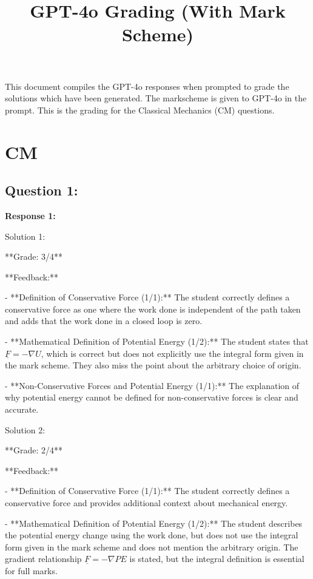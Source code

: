 \documentclass[a4paper,11pt]{article}
\begin{document}
\title{GPT-4o Grading (With Mark Scheme)}
\maketitle

This document compiles the GPT-4o responses when prompted to grade the solutions which have been generated. The markscheme is given to GPT-4o in the prompt. This is the grading for the Classical Mechanics (CM) questions. 

\section{CM}

\subsection*{Question 1:}

\textbf{Response 1:}

Solution 1:

**Grade: 3/4**

**Feedback:**

- **Definition of Conservative Force (1/1):** The student correctly defines a conservative force as one where the work done is independent of the path taken and adds that the work done in a closed loop is zero.

- **Mathematical Definition of Potential Energy (1/2):** The student states that \( \underline{F} = -\nabla U \), which is correct but does not explicitly use the integral form given in the mark scheme. They also miss the point about the arbitrary choice of origin.

- **Non-Conservative Forces and Potential Energy (1/1):** The explanation of why potential energy cannot be defined for non-conservative forces is clear and accurate.

Solution 2:

**Grade: 2/4**

**Feedback:**

- **Definition of Conservative Force (1/1):** The student correctly defines a conservative force and provides additional context about mechanical energy.

- **Mathematical Definition of Potential Energy (1/2):** The student describes the potential energy change using the work done, but does not use the integral form given in the mark scheme and does not mention the arbitrary origin. The gradient relationship \( \underline{F} = -\nabla PE \) is stated, but the integral definition is essential for full marks.
\end{document}

